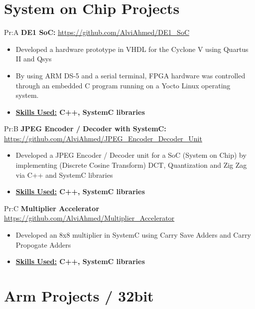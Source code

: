 \section*{System on Chip Projects}


Pr:A
\textbf{DE1 SoC: } \underline{\url{https://github.com/AlviAhmed/DE1_SoC}}
\begin{itemize}[noitemsep,nolistsep]
\item Developed a hardware prototype in VHDL for the Cyclone V using Quartus II and Qsys
\item By using ARM DS-5 and a serial terminal, FPGA hardware was controlled through an embedded C program running on a Yocto Linux operating system.
\item \textbf{\underline{Skills Used:} C++, SystemC libraries}
\end{itemize}


Pr:B
\textbf{JPEG Encoder / Decoder with SystemC: }
\underline{\url{https://github.com/AlviAhmed/JPEG_Encoder_Decoder_Unit}}
\begin{itemize}[noitemsep,nolistsep]
\item Developed a JPEG Encoder / Decoder unit for a SoC (System on Chip) by implementing
  (Discrete Cosine Transform) DCT, Quantization and Zig Zag via C++ and SystemC libraries
\item \textbf{\underline{Skills Used:} C++, SystemC libraries}
\end{itemize}


Pr:C
\textbf{Multiplier Accelerator}
\underline{\url{https://github.com/AlviAhmed/Multiplier_Accelerator}}
\begin{itemize}[noitemsep,nolistsep]
\item Developed an 8x8 multiplier in SystemC using Carry Save Adders and Carry Propogate Adders
\item \textbf{\underline{Skills Used:} C++, SystemC libraries}
\end{itemize}


\section*{Arm Projects / 32bit}


